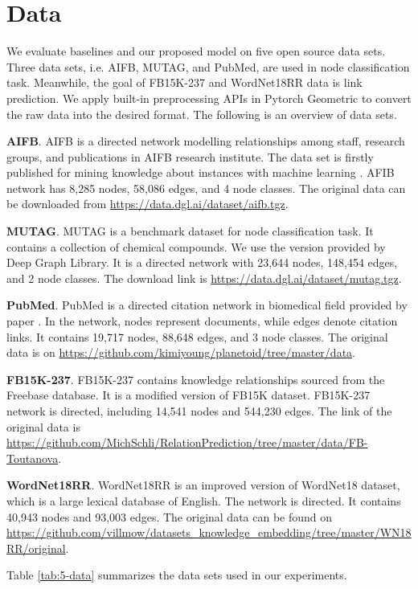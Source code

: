 \documentclass[sigconf]{acmart}
\begin{document}
\section{Data}\label{sec-data}
We evaluate baselines and our proposed model on five open source data sets. Three data sets, i.e. AIFB, MUTAG, and PubMed, are used in node classification task. Meanwhile, the goal of FB15K-237 and WordNet18RR data is link prediction. We apply built-in preprocessing APIs in Pytorch Geometric to convert the raw data into the desired format. The following is an overview of data sets.\par
\vspace{0.2cm}
\noindent\textbf{AIFB}. AIFB is a directed network modelling relationships among staff, research groups, and publications in AIFB research institute. The data set is firstly published for mining knowledge about instances with machine learning \cite{aifb}. AFIB network has 8,285 nodes, 58,086 edges, and 4 node classes. The original data can be downloaded from \url{https://data.dgl.ai/dataset/aifb.tgz}.\par
\vspace{0.2cm}
\noindent\textbf{MUTAG}. MUTAG is a benchmark dataset for node classification task. It contains a collection of chemical compounds. We use the version provided by Deep Graph Library. It is a directed network with 23,644 nodes, 148,454 edges, and 2 node classes. The download link is \url{https://data.dgl.ai/dataset/mutag.tgz}.\par
\vspace{0.2cm}
\noindent\textbf{PubMed}. PubMed is a directed citation network in biomedical field provided by paper \cite{pubmed}. In the network, nodes represent documents, while edges denote citation links. It contains 19,717 nodes, 88,648 edges, and 3 node classes. The original data is on \url{https://github.com/kimiyoung/planetoid/tree/master/data}.\par
\vspace{0.2cm}
\noindent\textbf{FB15K-237}. FB15K-237 contains knowledge relationships sourced from the Freebase database. It is a modified version of FB15K dataset. FB15K-237 network is directed, including 14,541 nodes and 544,230 edges. The link of the original data is \url{https://github.com/MichSchli/RelationPrediction/tree/master/data/FB-Toutanova}.\par
\vspace{0.2cm}
\noindent\textbf{WordNet18RR}. WordNet18RR is an improved version of WordNet18 dataset, which is a large lexical database of English. The network is directed. It contains 40,943 nodes and 93,003 edges. The original data can be found on \url{https://github.com/villmow/datasets_knowledge_embedding/tree/master/WN18RR/original}.\par
\vspace{0.2cm}
Table \ref{tab:5-data} summarizes the data sets used in our experiments.
\end{document}
